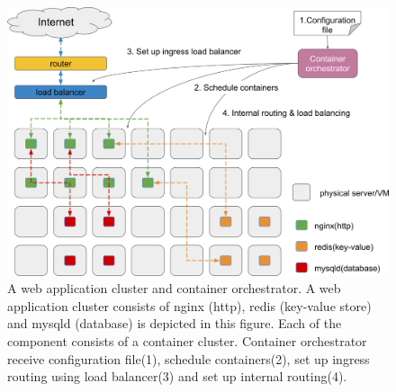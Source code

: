 \begin{figure}[h]
\begin{center}
\includegraphics[width=0.95\columnwidth]{Figs/container_management_system}
\end{center}

  \par\bigskip
  \centering
  \begin{minipage}{0.9\columnwidth}
    \caption[A web application cluster and container orchestrator]{
      A web application cluster and container orchestrator.
      A web application cluster consists of nginx (http), redis (key-value store) and mysqld (database) is depicted in this figure. 
      Each of the component consists of a container cluster.
      Container orchestrator receive configuration file(1), schedule containers(2), set up ingress routing using load balancer(3) and set up internal routing(4).
      }
    \label{fig:container_management_system}
  \end{minipage}
\end{figure}

